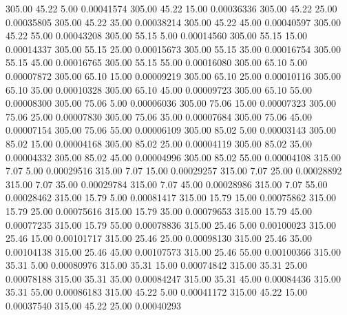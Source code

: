     305.00     45.22      5.00     0.00041574
    305.00     45.22     15.00     0.00036336
    305.00     45.22     25.00     0.00035805
    305.00     45.22     35.00     0.00038214
    305.00     45.22     45.00     0.00040597
    305.00     45.22     55.00     0.00043208
    305.00     55.15      5.00     0.00014560
    305.00     55.15     15.00     0.00014337
    305.00     55.15     25.00     0.00015673
    305.00     55.15     35.00     0.00016754
    305.00     55.15     45.00     0.00016765
    305.00     55.15     55.00     0.00016080
    305.00     65.10      5.00     0.00007872
    305.00     65.10     15.00     0.00009219
    305.00     65.10     25.00     0.00010116
    305.00     65.10     35.00     0.00010328
    305.00     65.10     45.00     0.00009723
    305.00     65.10     55.00     0.00008300
    305.00     75.06      5.00     0.00006036
    305.00     75.06     15.00     0.00007323
    305.00     75.06     25.00     0.00007830
    305.00     75.06     35.00     0.00007684
    305.00     75.06     45.00     0.00007154
    305.00     75.06     55.00     0.00006109
    305.00     85.02      5.00     0.00003143
    305.00     85.02     15.00     0.00004168
    305.00     85.02     25.00     0.00004119
    305.00     85.02     35.00     0.00004332
    305.00     85.02     45.00     0.00004996
    305.00     85.02     55.00     0.00004108
    315.00      7.07      5.00     0.00029516
    315.00      7.07     15.00     0.00029257
    315.00      7.07     25.00     0.00028892
    315.00      7.07     35.00     0.00029784
    315.00      7.07     45.00     0.00028986
    315.00      7.07     55.00     0.00028462
    315.00     15.79      5.00     0.00081417
    315.00     15.79     15.00     0.00075862
    315.00     15.79     25.00     0.00075616
    315.00     15.79     35.00     0.00079653
    315.00     15.79     45.00     0.00077235
    315.00     15.79     55.00     0.00078836
    315.00     25.46      5.00     0.00100023
    315.00     25.46     15.00     0.00101717
    315.00     25.46     25.00     0.00098130
    315.00     25.46     35.00     0.00104138
    315.00     25.46     45.00     0.00107573
    315.00     25.46     55.00     0.00100366
    315.00     35.31      5.00     0.00080976
    315.00     35.31     15.00     0.00074842
    315.00     35.31     25.00     0.00078188
    315.00     35.31     35.00     0.00084247
    315.00     35.31     45.00     0.00084436
    315.00     35.31     55.00     0.00086183
    315.00     45.22      5.00     0.00041172
    315.00     45.22     15.00     0.00037540
    315.00     45.22     25.00     0.00040293
